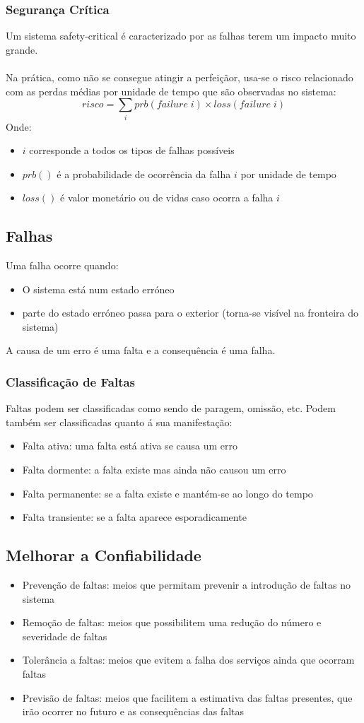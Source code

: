 \documentclass[10pt,a4paper]{report}
\begin{document}
\subsubsection{Segurança Crítica}
Um sistema safety-critical é caracterizado por as falhas terem um impacto muito grande.\\
\\
Na prática, como não se consegue atingir a perfeiçãor, usa-se o risco relacionado com
as perdas médias por unidade de tempo que são observadas no sistema:
$$
risco = \sum_i prb(failure\;i) \times loss(failure\;i)
$$
Onde:
\begin{itemize}
\item $i$ corresponde a todos os tipos de falhas possíveis
\item $prb()$ é a probabilidade de
ocorrência da falha $i$ por unidade de tempo
\item $loss()$ é valor monetário ou
de vidas caso ocorra a falha $i$
\end{itemize}
\subsection{Falhas}
Uma falha ocorre quando:
\begin{itemize}
\item O sistema está num estado erróneo
\item parte do estado erróneo passa para o exterior (torna-se visível na fronteira do sistema)
\end{itemize}
A causa de um erro é uma falta e a consequência é uma falha.
\subsubsection{Classificação de Faltas}
Faltas podem ser classificadas como sendo de paragem, omissão, etc. Podem também ser classificadas quanto á sua manifestação:
\begin{itemize}
\item Falta ativa: uma falta está ativa se causa um erro
\item Falta dormente: a falta existe mas ainda não causou um erro
\item Falta permanente: se a falta existe e mantém-se ao longo do tempo
\item Falta transiente: se a falta aparece esporadicamente
\end{itemize}
\subsection{Melhorar a Confiabilidade}
\begin{itemize}
\item Prevenção de faltas: meios que permitam prevenir a introdução de faltas no sistema
\item Remoção de faltas: meios que possibilitem uma redução do número e severidade de faltas
\item Tolerância a faltas: meios que evitem a falha dos serviços ainda que ocorram faltas
\item Previsão de faltas: meios que facilitem a estimativa das faltas presentes, que irão ocorrer no futuro e as consequências das faltas
\end{itemize}
\end{document}
